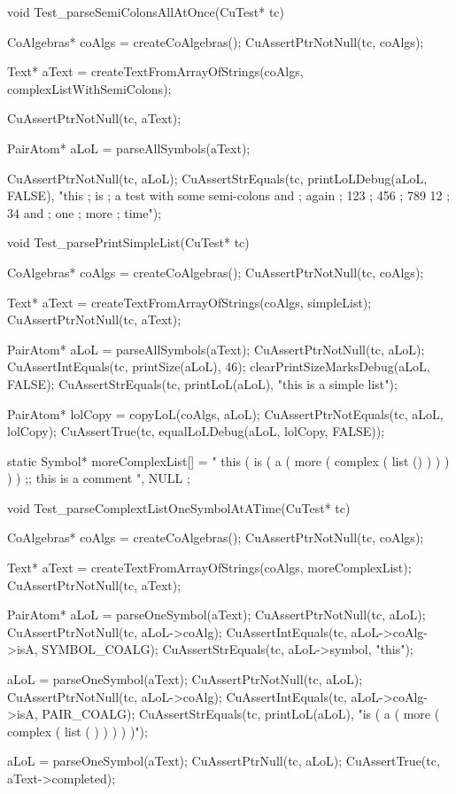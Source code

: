 void Test_parseSemiColonsAllAtOnce(CuTest* tc) {
  CoAlgebras* coAlgs = createCoAlgebras();
  CuAssertPtrNotNull(tc, coAlgs);

  Text* aText =
    createTextFromArrayOfStrings(coAlgs, complexListWithSemiColons);

  CuAssertPtrNotNull(tc, aText);

  PairAtom* aLoL = parseAllSymbols(aText);

  CuAssertPtrNotNull(tc, aLoL);
  CuAssertStrEquals(tc, printLoLDebug(aLoL, FALSE),
    "this ; is ; a test with some semi-colons and ; again ; 123 ; 456 ; 789 12 ; 34 and ; one ; more ; time");
}

void Test_parsePrintSimpleList(CuTest* tc) {
  CoAlgebras* coAlgs = createCoAlgebras();
  CuAssertPtrNotNull(tc, coAlgs);

  Text* aText = createTextFromArrayOfStrings(coAlgs, simpleList);
  CuAssertPtrNotNull(tc, aText);

  PairAtom* aLoL = parseAllSymbols(aText);
  CuAssertPtrNotNull(tc, aLoL);
  CuAssertIntEquals(tc, printSize(aLoL), 46);
  clearPrintSizeMarksDebug(aLoL, FALSE);
  CuAssertStrEquals(tc, printLoL(aLoL), "this is a simple list");

  PairAtom* lolCopy = copyLoL(coAlgs, aLoL);
  CuAssertPtrNotEquals(tc, aLoL, lolCopy);
  CuAssertTrue(tc, equalLoLDebug(aLoL, lolCopy, FALSE));
}

static Symbol* moreComplexList[] = {
 " this ( is ( a ( more ( complex ( list () ) ) ) ) ) ;; this is a comment ",
 NULL
};

void Test_parseComplextListOneSymbolAtATime(CuTest* tc) {
  CoAlgebras* coAlgs = createCoAlgebras();
  CuAssertPtrNotNull(tc, coAlgs);

  Text* aText = createTextFromArrayOfStrings(coAlgs, moreComplexList);
  CuAssertPtrNotNull(tc, aText);

  PairAtom* aLoL = parseOneSymbol(aText);
  CuAssertPtrNotNull(tc, aLoL);
  CuAssertPtrNotNull(tc, aLoL->coAlg);
  CuAssertIntEquals(tc, aLoL->coAlg->isA, SYMBOL_COALG);
  CuAssertStrEquals(tc, aLoL->symbol, "this");

  aLoL = parseOneSymbol(aText);
  CuAssertPtrNotNull(tc, aLoL);
  CuAssertPtrNotNull(tc, aLoL->coAlg);
  CuAssertIntEquals(tc, aLoL->coAlg->isA, PAIR_COALG);
  CuAssertStrEquals(tc, printLoL(aLoL),
                    "is ( a ( more ( complex ( list ( ) ) ) ) )");

  aLoL = parseOneSymbol(aText);
  CuAssertPtrNull(tc, aLoL);
  CuAssertTrue(tc, aText->completed);
}

